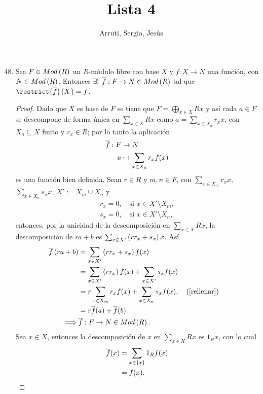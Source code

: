 \documentclass{article}
\title{Lista 4}
\author{Arruti, Sergio, Jesús}
\date{}
\begin{document}
	\maketitle
	\begin{enumerate}[label=\textbf{Ej \arabic*.}]
		\setcounter{enumi}{47}
		\item Sea $F\in Mod\left(R\right)$ un $R$-módulo libre con base $X$ y $f:X\to N$ una función, con $N\in Mod\left(R\right)$. Entonces $\exists !$ $\overline{f}:F\to N\in Mod\left(R\right)$ tal que $\restrict{\overline{f}}{X}=f$.
		\begin{proof}
			Dado que $X$ es base de $F$ se tiene que $F=\bigoplus_{x\in X}R x$ y así cada $a\in F$ se descompone de forma única en $\sum\limits_{x\in X}R x$ como $a=\sum\limits_{x\in X_a}r_x x$, con $X_a\subseteq X$ finito y $r_x\in R$; por lo tanto la aplicación
			\begin{align*}
				\overline{f}: F &\rightarrow N\\ a &\mapsto \sum\limits_{x\in X_a}r_x f(x)
			\end{align*}
			es una función bien definida. Sean $r\in R$ y $m, n\in F$, con $\sum\limits_{x\in X_m}r_x x$, $\sum\limits_{x\in X_n}s_x x$, $X':=X_m \cup X_n$ y
			\begin{equation*}\label{rellenar}\tag{*}
				\begin{split}
				r_x=0,\quad\text{si }x\in X'\setminus X_m,\\
				s_x=0,\quad\text{si }x\in X'\setminus X_n,
				\end{split}
			\end{equation*}
		 	 entonces, por la unicidad de la descomposición en $\sum\limits_{x\in X}R x$, la descomposición de $ra+b$ es $\sum_{x\in X'}\left(rr_x +s_x\right)x$. Así
			\begin{align*}
				\overline{f}\left(ra+b\right)&=\sum_{x\in X'}\left(rr_x +s_x\right)f(x)\\
							&=\sum_{x\in X'}\left(rr_x\right)f(x)+\sum_{x\in X'}s_x f(x)\\
							&=r\sum_{x\in X_m}r_x f(x)+\sum_{x\in X_n}s_x f(x), && \left(\ref{rellenar}\right)\\
							&=r\overline{f}(a)+\overline{f}(b).\\
				\implies & \overline{f}:F\to N \in Mod\left(R\right).
			\end{align*}
			Sea $x\in X$, entonces la descomposición de $x$ en $\sum_{x\in X}R x$ es $1_Rx$, con lo cual 
			\begin{align*}
				\overline{f}(x)&=\sum_{x\in \lrbrack{x}}1_R f(x)\\
					&=f(x).\\

\end{align*}
\end{proof}
\end{enumerate}
\end{document}
